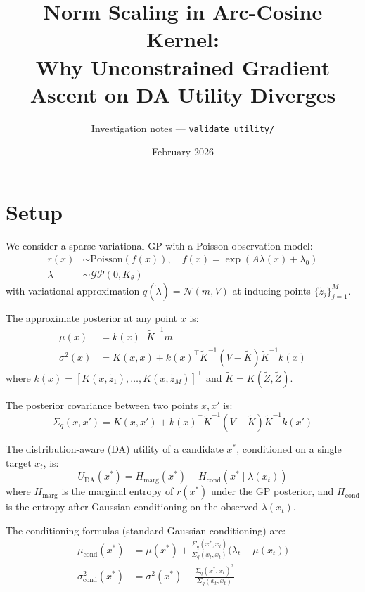 \documentclass[11pt]{article}
\title{Norm Scaling in Arc-Cosine Kernel:\\Why Unconstrained Gradient Ascent on DA Utility Diverges}
\author{Investigation notes --- \texttt{validate\_utility/}}
\date{February 2026}
\begin{document}
\maketitle

\section{Setup}

We consider a sparse variational GP with a Poisson observation model:
\begin{align}
    r(x) &\sim \text{Poisson}(f(x)), \quad f(x) = \exp(A \lambda(x) + \lambda_0) \\
    \lambda &\sim \mathcal{GP}(0, K_\theta)
\end{align}
with variational approximation $q(\tilde{\lambda}) = \mathcal{N}(m, V)$ at inducing points $\{\tilde{z}_j\}_{j=1}^M$.

The approximate posterior at any point $x$ is:
\begin{align}
    \mu(x) &= k(x)^\top \tilde{K}^{-1} m \label{eq:post_mean}\\
    \sigma^2(x) &= K(x,x) + k(x)^\top \tilde{K}^{-1}(V - \tilde{K})\tilde{K}^{-1} k(x) \label{eq:post_var}
\end{align}
where $k(x) = [K(x, \tilde{z}_1), \ldots, K(x, \tilde{z}_M)]^\top$ and $\tilde{K} = K(\tilde{Z}, \tilde{Z})$.

The posterior covariance between two points $x, x'$ is:
\begin{equation}\label{eq:post_cov}
    \Sigma_q(x, x') = K(x, x') + k(x)^\top \tilde{K}^{-1}(V - \tilde{K})\tilde{K}^{-1} k(x')
\end{equation}

The distribution-aware (DA) utility of a candidate $x^*$, conditioned on a single target $x_t$, is:
\begin{equation}\label{eq:da_utility}
    U_{\text{DA}}(x^*) = H_{\text{marg}}(x^*) - H_{\text{cond}}(x^* \mid \lambda(x_t))
\end{equation}
where $H_{\text{marg}}$ is the marginal entropy of $r(x^*)$ under the GP posterior,
and $H_{\text{cond}}$ is the entropy after Gaussian conditioning on the observed $\lambda(x_t)$.

The conditioning formulas (standard Gaussian conditioning) are:
\begin{align}
    \mu_{\text{cond}}(x^*) &= \mu(x^*) + \frac{\Sigma_q(x^*, x_t)}{\Sigma_q(x_t, x_t)} \bigl(\lambda_t - \mu(x_t)\bigr) \label{eq:cond_mean}\\
    \sigma^2_{\text{cond}}(x^*) &= \sigma^2(x^*) - \frac{\Sigma_q(x^*, x_t)^2}{\Sigma_q(x_t, x_t)} \label{eq:cond_var}
\end{align}
\end{document}
